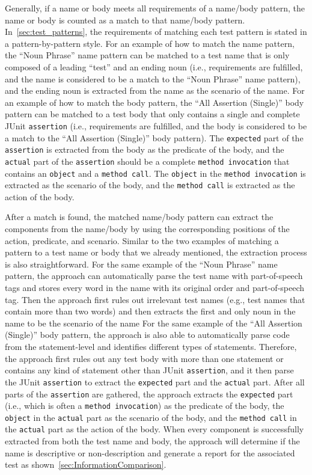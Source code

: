 Generally, if a name or body meets all requirements of a name\slash body pattern, the name or body is counted as a match to that name\slash body pattern.
%
In~\cref{sec:test_patterns}, the requirements of matching each test pattern is stated in a pattern-by-pattern style.
%
For an example of how to match the name pattern, the \enquote{Noun Phrase} name pattern can be matched to a test name that is only composed of a leading \enquote{test} and an ending noun (i.e., requirements are fulfilled, and the name is considered to be a match to the \enquote{Noun Phrase} name pattern), and the ending noun is extracted from the name as the scenario of the name.
%
For an example of how to match the body pattern, the \enquote{All Assertion (Single)} body pattern can be matched to a test body that only contains a single and complete JUnit \texttt{assertion} (i.e., requirements are fulfilled, and the body is considered to be a match to the \enquote{All Assertion (Single)} body pattern).
%
The \texttt{expected} part of the \texttt{assertion} is extracted from the body as the predicate of the body, and the \texttt{actual} part of the \texttt{assertion} should be a complete \texttt{method invocation} that contains an \texttt{object} and a \texttt{method call}.
%
The \texttt{object} in the \texttt{method invocation} is extracted as the scenario of the body, and the \texttt{method call} is extracted as the action of the body.


After a match is found, the matched name\slash body pattern can extract the components from the name\slash body by using the corresponding positions of the action, predicate, and scenario.
%
Similar to the two examples of matching a pattern to a test name or body that we already mentioned, the extraction process is also straightforward.
%
For the same example of the \enquote{Noun Phrase} name pattern, the approach can automatically parse the test name with part-of-speech tags and stores every word in the name with its original order and part-of-speech tag.
%
Then the approach first rules out irrelevant test names (e.g., test names that contain more than two words) and then extracts the first and only noun in the name to be the scenario of the name
%
For the same example of the \enquote{All Assertion (Single)} body pattern, the approach is also able to automatically parse code from the statement-level and identifies different types of statements.
%
Therefore, the approach first rules out any test body with more than one statement or contains any kind of statement other than JUnit \texttt{assertion}, and it then parse the JUnit \texttt{assertion} to extract the \texttt{expected} part and the \texttt{actual} part.
%
After all parts of the \texttt{assertion} are gathered, the approach extracts the \texttt{expected} part (i.e., which is often a \texttt{method invocation}) as the predicate of the body, the \texttt{object} in the \texttt{actual} part as the scenario of the body, and the \texttt{method call} in the \texttt{actual} part as the action of the body.
%
When every component is successfully extracted from both the test name and body, the approach will determine if the name is descriptive or non-description and generate a report for the associated test as shown~\cref{sec:InformationComparison}.


